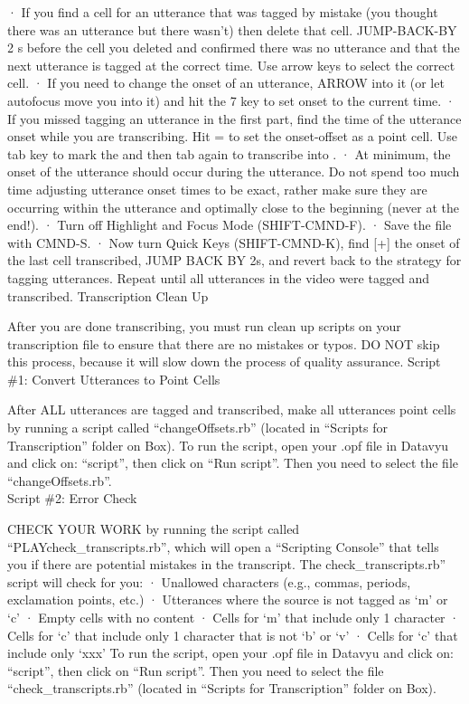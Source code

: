 \documentclass[
  12pt,
]{book}
\begin{document}
· If you find a cell for an utterance that was tagged by mistake (you thought there was an utterance but there wasn't) then delete that cell. JUMP-BACK-BY 2 s before the cell you deleted and confirmed there was no utterance and that the next utterance is tagged at the correct time. Use arrow keys to select the correct cell.
· If you need to change the onset of an utterance, ARROW into it (or let autofocus move you into it) and hit the 7 key to set onset to the current time.
· If you missed tagging an utterance in the first part, find the time of the utterance onset while you are transcribing. Hit = to set the onset-offset as a point cell. Use tab key to mark the and then tab again to transcribe into .
· At minimum, the onset of the utterance should occur during the utterance. Do not spend too much time adjusting utterance onset times to be exact, rather make sure they are occurring within the utterance and optimally close to the beginning (never at the end!).
· Turn off Highlight and Focus Mode (SHIFT-CMND-F).
· Save the file with CMND-S.
· Now turn Quick Keys (SHIFT-CMND-K), find {[}+{]} the onset of the last cell transcribed, JUMP BACK BY 2s, and revert back to the strategy for tagging utterances.
Repeat until all utterances in the video were tagged and transcribed.
Transcription Clean Up

After you are done transcribing, you must run clean up scripts on your transcription file to ensure that there are no mistakes or typos. DO NOT skip this process, because it will slow down the process of quality assurance.
Script \#1: Convert Utterances to Point Cells

After ALL utterances are tagged and transcribed, make all utterances point cells by running a script called ``changeOffsets.rb'' (located in ``Scripts for Transcription'' folder on Box).
To run the script, open your .opf file in Datavyu and click on: ``script'', then click on ``Run script''. Then you need to select the file ``changeOffsets.rb''.\\
Script \#2: Error Check

CHECK YOUR WORK by running the script called ``PLAYcheck\_transcripts.rb'', which will open a ``Scripting Console'' that tells you if there are potential mistakes in the transcript.
The check\_transcripts.rb'' script will check for you:
· Unallowed characters (e.g., commas, periods, exclamation points, etc.)
· Utterances where the source is not tagged as `m' or `c'
· Empty cells with no content
· Cells for `m' that include only 1 character
· Cells for `c' that include only 1 character that is not `b' or `v'
· Cells for `c' that include only `xxx'
To run the script, open your .opf file in Datavyu and click on: ``script'', then click on ``Run script''. Then you need to select the file ``check\_transcripts.rb'' (located in ``Scripts for Transcription'' folder on Box).
\end{document}
